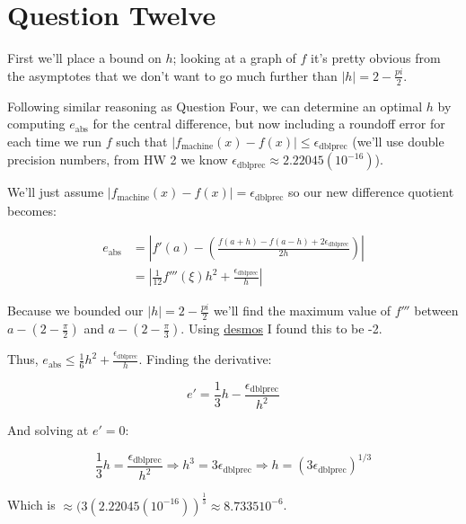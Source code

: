 \documentclass[11pt]{article}
\begin{document}
\section{Question Twelve}
\label{sec:orgc55bfd1}

First we'll place a bound on \(h\); looking at a graph of \(f\) it's pretty obvious from the asymptotes that we don't want to go much further than \(|h| = 2 - \frac{pi}{2}\).

Following similar reasoning as Question Four, we can determine an optimal \(h\) by computing \(e_{\text{abs}}\) for the central difference, but now including a roundoff error for each time we run \(f\)
such that \(|f_{\text{machine}}(x) - f(x)| \le \epsilon_{\text{dblprec}}\) (we'll use double precision numbers, from HW 2 we know \(\epsilon_{\text{dblprec}} \approx 2.22045 (10^{-16})\)).

We'll just assume \(|f_{\text{machine}}(x) - f(x)| = \epsilon_{\text{dblprec}}\) so our new difference quotient becomes:

\begin{align*}
e_{\text{abs}} &= |f'(a) - (\frac{f(a+h) - f(a-h) + 2\epsilon_{\text{dblprec}}}{2h})| \\
&= |\frac{1}{12}f'''(\xi)h^2 + \frac{\epsilon_{\text{dblprec}}}{h}|
\end{align*}

Because we bounded our \(|h| = 2 - \frac{pi}{2}\) we'll find the maximum value of \(f'''\) between \(a - (2 - \frac{\pi}{2})\) and \(a - (2 - \frac{\pi}{3})\). Using \href{https://www.desmos.com/calculator/gen1zpohh2}{desmos} I found this to be -2.

Thus, \(e_{\text{abs}} \leq \frac{1}{6}h^2 + \frac{\epsilon_{\text{dblprec}}}{h}\). Finding the derivative:

\begin{equation*}
e' = \frac{1}{3}h - \frac{\epsilon_{\text{dblprec}}}{h^2}
\end{equation*}

And solving at \(e' = 0\):

\begin{equation*}
\frac{1}{3}h = \frac{\epsilon_{\text{dblprec}}}{h^2} \Rightarrow h^3 = 3\epsilon_{\text{dblprec}} \Rightarrow h = (3\epsilon_{\text{dblprec}})^{1/3}
\end{equation*}

Which is \(\approx (3(2.22045 (10^{-16}))^{\frac{1}{3}} \approx 8.7335 10^{-6}\).
\end{document}
